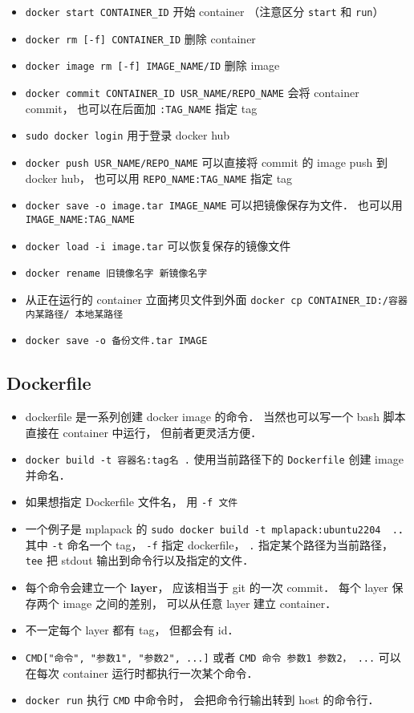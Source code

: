 \begin{itemize}
\item \verb`docker start CONTAINER_ID` 开始 container （注意区分 \verb|start| 和 \verb|run|）
\item \verb`docker rm [-f] CONTAINER_ID` 删除 container
\item \verb`docker image rm [-f] IMAGE_NAME/ID` 删除 image
\item \verb`docker commit CONTAINER_ID USR_NAME/REPO_NAME` 会将 container commit， 也可以在后面加 \verb`:TAG_NAME` 指定 tag
\item \verb`sudo docker login` 用于登录 docker hub
\item \verb`docker push USR_NAME/REPO_NAME` 可以直接将 commit 的 image push 到 docker hub， 也可以用 \verb`REPO_NAME:TAG_NAME` 指定 tag
\item \verb|docker save -o image.tar IMAGE_NAME| 可以把镜像保存为文件． 也可以用 \verb|IMAGE_NAME:TAG_NAME|
\item \verb|docker load -i image.tar| 可以恢复保存的镜像文件
\item \verb|docker rename 旧镜像名字 新镜像名字|
\item 从正在运行的 container 立面拷贝文件到外面 \verb|docker cp CONTAINER_ID:/容器内某路径/ 本地某路径|
\item \verb|docker save -o 备份文件.tar IMAGE|
\end{itemize}

\subsection{Dockerfile}
\begin{itemize}
\item dockerfile 是一系列创建 docker image 的命令． 当然也可以写一个 bash 脚本直接在 container 中运行， 但前者更灵活方便．
\item \verb|docker build -t 容器名:tag名 .| 使用当前路径下的 \verb|Dockerfile| 创建 image 并命名．
\item 如果想指定 Dockerfile 文件名， 用 \verb|-f 文件|
\item 一个例子是 mplapack 的 \verb|sudo docker build -t mplapack:ubuntu2204  .|． 其中 \verb|-t| 命名一个 tag， \verb|-f| 指定 dockerfile， \verb|.| 指定某个路径为当前路径， \verb|tee| 把 stdout 输出到命令行以及指定的文件．
\item 每个命令会建立一个 \textbf{layer}， 应该相当于 git 的一次 commit． 每个 layer 保存两个 image 之间的差别， 可以从任意 layer 建立 container．
\item 不一定每个 layer 都有 tag， 但都会有 id．
\item \verb|CMD["命令", "参数1", "参数2", ...]| 或者 \verb|CMD 命令 参数1 参数2， ...| 可以在每次 container 运行时都执行一次某个命令．
\item \verb|docker run| 执行 \verb|CMD| 中命令时， 会把命令行输出转到 host 的命令行．
\end{itemize}

